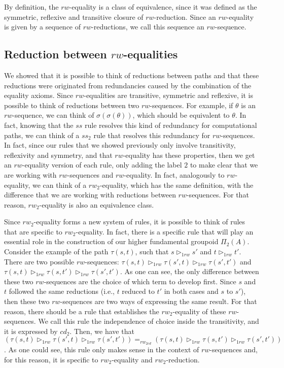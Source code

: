 \documentclass[12pt, a4paper,  oneside, headinclude,footinclude, BCOR5mm]{scrartcl}
\begin{document}
By definition, the $rw$-equality is a class of equivalence, since it was defined as the symmetric, reflexive and transitive closure of $rw$-reduction. Since an $rw$-equality is given by a sequence of $rw$-reductions, we call this sequence an $rw$-sequence.

\subsection{Reduction between $rw$-equalities}

We showed that it is possible to think of reductions between paths and that these reductions were originated from redundancies caused by the combination of the equality axioms. Since $rw$-equalities are transitive, symmetric and reflexive, it is possible to think of reductions between two $rw$-sequences. For example, if $\theta$ is an $rw$-sequence, we can think of $\sigma(\sigma(\theta))$, which should be equivalent to $\theta$. In fact, knowing that the $ss$ rule resolves this kind of redundancy for computational paths, we can think of a $ss_{2}$ rule that resolves this redundancy for $rw$-sequences. In fact, since our rules that we showed previously only involve transitivity, reflexivity and symmetry, and that $rw$-equality has these properties, then we get an $rw$-equality version of each rule, only adding the label $2$ to make clear that we are working with $rw$-sequences and $rw$-equality. In fact, analogously to $rw$-equality, we can think of a $rw_{2}$-equality, which has the same definition, with the difference that we are working with reductions between $rw$-sequences. For that reason, $rw_{2}$-equality is also an equivalence class.

Since $rw_{2}$-equality forms a new system of rules, it is possible to think of rules that are specific to $rw_{2}$-equality. In fact, there is a specific rule that will play an essential role in the construction of our higher fundamental groupoid $\Pi_{2}(A)$. Consider the example of the path $\tau(s,t)$, such that $s \rhd_{1rw} s'$ and $t \rhd_{1rw} t'$. There are two possible $rw$-sequences: $\tau(s,t) \rhd_{1rw} \tau(s',t) \rhd_{1rw} \tau(s',t')$ and $\tau(s,t) \rhd_{1rw} \tau(s,t') \rhd_{1rw} \tau(s',t')$. As one can see, the only difference between these two $rw$-sequences are the choice of which term to develop first. Since $s$ and $t$ followed the same reductions (i.e., $t$ reduced to $t'$ in both cases and $s$ to $s'$), then these two $rw$-sequences are two ways of expressing the same result. For that reason, there should be a rule that establishes the $rw_{2}$-equality of these $rw$-sequences. We call this rule the independence of choice inside the transitivity, and it is expressed by $cd_{2}$. Then, we have that  $(\tau(s,t) \rhd_{1rw} \tau(s',t) \rhd_{1rw} \tau(s',t')) =_{rw_{2cd}} (\tau(s,t) \rhd_{1rw} \tau(s,t') \rhd_{1rw} \tau(s',t'))$. As one could see, this rule only makes sense in the context of $rw$-sequences and, for this reason, it is specific to $rw_{2}$-equality and $rw_{2}$-reduction.
\end{document}
